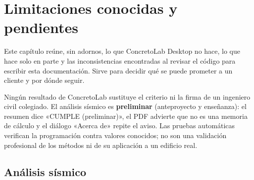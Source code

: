 \section{Limitaciones conocidas y pendientes}
\label{sec:lim-limitaciones}

Este capítulo reúne, sin adornos, lo que ConcretoLab Desktop \versionapp{} no hace, lo que hace solo en parte y las
inconsistencias encontradas al revisar el código para escribir esta documentación. Sirve para decidir qué se puede
prometer a un cliente y por dónde seguir.

\begin{advertencia}
Ningún resultado de ConcretoLab sustituye el criterio ni la firma de un ingeniero civil colegiado. El análisis sísmico
es \textbf{preliminar} (anteproyecto y enseñanza): el resumen dice «CUMPLE (preliminar)», el PDF advierte que no es una
memoria de cálculo y el diálogo «Acerca de» repite el aviso. Las pruebas automáticas verifican la programación contra
valores conocidos; no son una validación profesional de los métodos ni de su aplicación a un edificio real.
\end{advertencia}

\subsection{Análisis sísmico}

